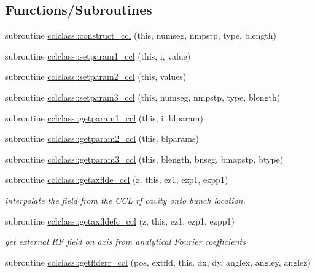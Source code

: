 \subsection*{Functions/\+Subroutines}
\begin{DoxyCompactItemize}
\item 
subroutine \mbox{\hyperlink{namespacecclclass_af38d062f04c18827d1d2a76c17039c58}{cclclass\+::construct\+\_\+ccl}} (this, numseg, nmpstp, type, blength)
\item 
subroutine \mbox{\hyperlink{namespacecclclass_adf1829da601e1090ce5f5e5046c4d62c}{cclclass\+::setparam1\+\_\+ccl}} (this, i, value)
\item 
subroutine \mbox{\hyperlink{namespacecclclass_a7bc5a807438db526489d8773fa168375}{cclclass\+::setparam2\+\_\+ccl}} (this, values)
\item 
subroutine \mbox{\hyperlink{namespacecclclass_a5a90756fe0684d2f29121a368dbef489}{cclclass\+::setparam3\+\_\+ccl}} (this, numseg, nmpstp, type, blength)
\item 
subroutine \mbox{\hyperlink{namespacecclclass_a3cb17684a6eef64dd3c35cbb03bcb8b3}{cclclass\+::getparam1\+\_\+ccl}} (this, i, blparam)
\item 
subroutine \mbox{\hyperlink{namespacecclclass_ad1c56a9447d1ff854afdc5502ae0fe18}{cclclass\+::getparam2\+\_\+ccl}} (this, blparams)
\item 
subroutine \mbox{\hyperlink{namespacecclclass_ad223096667fbe2e53bae56b52b2350fa}{cclclass\+::getparam3\+\_\+ccl}} (this, blength, bnseg, bmapstp, btype)
\item 
subroutine \mbox{\hyperlink{namespacecclclass_a881db4a51cdc73a6c489b2814565a243}{cclclass\+::getaxflde\+\_\+ccl}} (z, this, ez1, ezp1, ezpp1)
\begin{DoxyCompactList}\small\item\em interpolate the field from the C\+CL rf cavity onto bunch location. \end{DoxyCompactList}\item 
subroutine \mbox{\hyperlink{namespacecclclass_a06d52f7ecb50e977ef5e2330506180d2}{cclclass\+::getaxfldefc\+\_\+ccl}} (z, this, ez1, ezp1, ezpp1)
\begin{DoxyCompactList}\small\item\em get external RF field on axis from analytical Fourier coefficients \end{DoxyCompactList}\item 
subroutine \mbox{\hyperlink{namespacecclclass_a4d8386891ff89c7352f001b01d5f84b5}{cclclass\+::getflderr\+\_\+ccl}} (pos, extfld, this, dx, dy, anglex, angley, anglez)

\end{DoxyCompactItemize}
